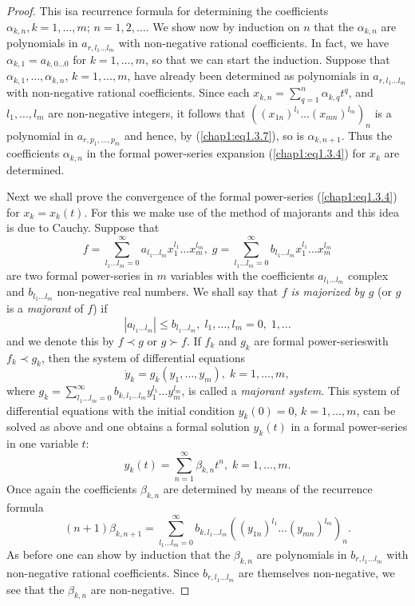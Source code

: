 \begin{proof}
This is\pageoriginale a recurrence formula for determining the coefficients $\alpha_{k,n}, k=1,\ldots,m$; $n=1,2,\ldots$. We show now by induction on $n$ that the $\alpha_{k,n}$ are polynomials in $a_{r,l_1 \ldots l_m}$ with non-negative rational coefficients. In fact, we have $\alpha_{k,1} = a_{k,0\ldots 0}$ for $k=1,\ldots , m$, so that we can start the induction. Suppose that $\alpha_{k,1}, \ldots, \alpha_{k,n}$, $k = 1, \ldots, m$, have already been determined as polynomials in $a_{r,l_1\ldots l_m}$ with non-negative rational coefficients. Since each $x_{k,n} = \sum\limits^n_{q=1} \alpha_{k,q} t^q$, and $l_1, \ldots, l_m$ are non-negative integers, it follows that $((x_{1n})^{l_1} \ldots (x_{mn})^{l_m})_n$ is a polynomial in $a_{r,p_1, \ldots, p_m}$ and hence, by (\ref{chap1:eq1.3.7}), so is $\alpha_{k,n+1}$. Thus the coefficients $\alpha_{k,n}$ in the formal power-series expansion (\ref{chap1:eq1.3.4}) for $x_k$ are determined.

Next we shall prove the convergence of the formal power-series (\ref{chap1:eq1.3.4}) for $x_k = x_k(t)$. For this we make use of the method of majorants and this idea is due to Cauchy. Suppose that
$$
f = \sum\limits^\infty_{l_1 \ldots l_m = 0} a_{l_1 \ldots l_m} x^{l_1}_1 \ldots x^{l_m}_m , \; g = \sum\limits^\infty_{l_1 \ldots l_m = 0} b_{l_1 \ldots l_m} x^{l_1}_1 \ldots x^{l_m}_m
$$
are two formal power-series in $m$ variables with the coefficients $a_{l_1 \ldots l_m}$ complex and $b_{l_1 \ldots l_m}$ non-negative real numbers. We shall say that $f$ {\em is majorized by $g$} (or $g$ is a {\em majorant} of $f$) if
$$
|a_{l_1 \ldots l_m}| \leq b_{l_1 \ldots l_m} , \; l_1, \ldots, l_m = 0, \; 1, \ldots
$$
and we denote this by $f \prec g$ or $g  \succ f$. If $f_k$ and $g_k$ are formal power-series\pageoriginale with $f_k \prec g_k$, then the system of differential equations 
$$
\dot{y}_k = g_k(y_1, \ldots, y_m) , \; k = 1, \ldots, m,
$$
where $g_k = \sum\limits^\infty_{l_1 \ldots l_m = 0} b_{k,l_1\ldots l_m} y^{l_1}_1 \ldots y^{l_m}_m$, is called a {\em majorant system}. This system of differential equations with the initial condition $y_k(0) = 0$, $k=1, \ldots, m$, can be solved as above and one obtains a formal solution $y_k(t)$ in a formal power-series in one variable $t$:
$$
y_k(t) = \sum\limits^\infty_{n=1} \beta_{k,n} t^n, \; k = 1, \ldots , m.
$$
Once again the coefficients $\beta_{k,n}$ are determined by means of the recurrence formula
\begin{equation*}
(n+1) \beta_{k,n+1} = \sum\limits^\infty_{l_1 \ldots l_m = 0} b_{k,l_1\ldots l_m} ((y_{1n})^{l_1} \ldots (y_{mn})^{l_m})_n. \tag{1.3.8}\label{chap1:eq1.3.8}
\end{equation*}
As before one can show by induction that the $\beta_{k,n}$ are polynomials in $b_{r, l_1 \ldots l_m}$ with non-negative rational coefficients. Since $b_{r, l_1 \ldots l_m}$ are themselves non-negative, we see that the $\beta_{k,n}$ are non-negative.


\end{proof}
